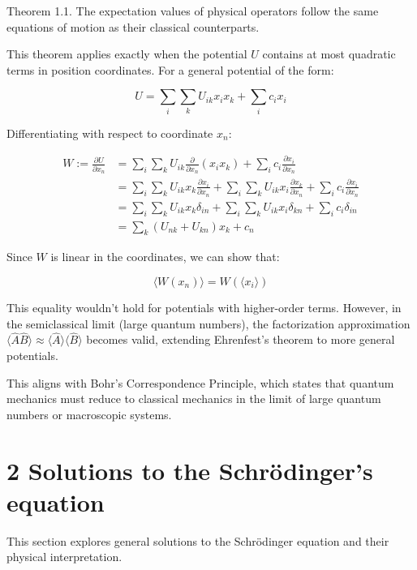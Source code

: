 \documentclass[10pt]{article}
\begin{document}
Theorem 1.1. The expectation values of physical operators follow the same equations of motion as their classical counterparts.

This theorem applies exactly when the potential $U$ contains at most quadratic terms in position coordinates. For a general potential of the form:

\begin{equation*}
U = \sum_i \sum_k U_{ik}x_i x_k + \sum_i c_i x_i \tag{1.95}
\end{equation*}

Differentiating with respect to coordinate $x_n$:

\begin{align*}
W := \frac{\partial U}{\partial x_n} &= \sum_i \sum_k U_{ik}\frac{\partial}{\partial x_n}(x_i x_k) + \sum_i c_i \frac{\partial x_i}{\partial x_n} \\
&= \sum_i \sum_k U_{ik}x_k\frac{\partial x_i}{\partial x_n} + \sum_i \sum_k U_{ik}x_i\frac{\partial x_k}{\partial x_n} + \sum_i c_i\frac{\partial x_i}{\partial x_n} \\
&= \sum_i \sum_k U_{ik}x_k\delta_{in} + \sum_i \sum_k U_{ik}x_i\delta_{kn} + \sum_i c_i\delta_{in} \\
&= \sum_k(U_{nk} + U_{kn})x_k + c_n \tag{1.96}
\end{align*}

Since $W$ is linear in the coordinates, we can show that:

\begin{equation*}
\langle W(x_n)\rangle = W(\langle x_i\rangle) \tag{1.97}
\end{equation*}

This equality wouldn't hold for potentials with higher-order terms. However, in the semiclassical limit (large quantum numbers), the factorization approximation $\langle\hat{A}\hat{B}\rangle \approx \langle\hat{A}\rangle\langle\hat{B}\rangle$ becomes valid, extending Ehrenfest's theorem to more general potentials.

This aligns with Bohr's Correspondence Principle, which states that quantum mechanics must reduce to classical mechanics in the limit of large quantum numbers or macroscopic systems.

\section*{2 Solutions to the Schrödinger's equation}

This section explores general solutions to the Schrödinger equation and their physical interpretation.
\end{document}
